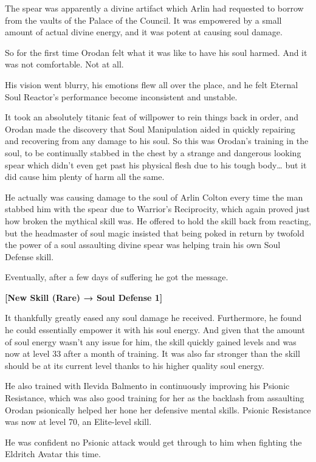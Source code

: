 \documentclass[a4paper,10pt]{book}
\begin{document}
The spear was apparently a divine artifact which Arlin had requested to borrow from the vaults of the Palace of the Council. It was empowered by a small amount of actual divine energy, and it was potent at causing soul damage.\par
So for the first time Orodan felt what it was like to have his soul harmed. And it was not comfortable. Not at all.\par
His vision went blurry, his emotions flew all over the place, and he felt Eternal Soul Reactor’s performance become inconsistent and unstable.\par
It took an absolutely titanic feat of willpower to rein things back in order, and Orodan made the discovery that Soul Manipulation aided in quickly repairing and recovering from any damage to his soul. So this was Orodan’s training in the soul, to be continually stabbed in the chest by a strange and dangerous looking spear which didn’t even get past his physical flesh due to his tough body… but it did cause him plenty of harm all the same.\par
He actually was causing damage to the soul of Arlin Colton every time the man stabbed him with the spear due to Warrior’s Reciprocity, which again proved just how broken the mythical skill was. He offered to hold the skill back from reacting, but the headmaster of soul magic insisted that being poked in return by twofold the power of a soul assaulting divine spear was helping train his own Soul Defense skill.\par
Eventually, after a few days of suffering he got the message.\par
\textbf{[New Skill (Rare) → Soul Defense 1]}\par
It thankfully greatly eased any soul damage he received. Furthermore, he found he could essentially empower it with his soul energy. And given that the amount of soul energy wasn’t any issue for him, the skill quickly gained levels and was now at level 33 after a month of training. It was also far stronger than the skill should be at its current level thanks to his higher quality soul energy.\par
He also trained with Ilevida Balmento in continuously improving his Psionic Resistance, which was also good training for her as the backlash from assaulting Orodan psionically helped her hone her defensive mental skills. Psionic Resistance was now at level 70, an Elite-level skill.\par
He was confident no Psionic attack would get through to him when fighting the Eldritch Avatar this time.\par
\end{document}
